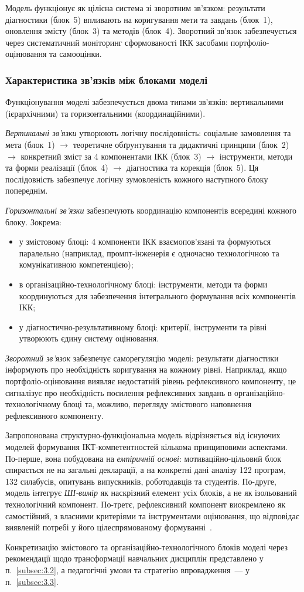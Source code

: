 Модель функціонує як цілісна система зі зворотним зв'язком: результати діагностики (блок~5) впливають на коригування мети та завдань (блок~1), оновлення змісту (блок~3) та методів (блок~4). Зворотний зв'язок забезпечується через систематичний моніторинг сформованості ІКК засобами портфоліо-оцінювання та самооцінки.

\subsubsection{Характеристика зв'язків між блоками моделі}\label{sssec:3.1.7}

Функціонування моделі забезпечується двома типами зв'язків: вертикальними (ієрархічними) та горизонтальними (координаційними).

\textit{Вертикальні зв'язки} утворюють логічну послідовність: соціальне замовлення та мета (блок~1) $\to$ теоретичне обґрунтування та дидактичні принципи (блок~2) $\to$ конкретний зміст за 4 компонентами ІКК (блок~3) $\to$ інструменти, методи та форми реалізації (блок~4) $\to$ діагностика та корекція (блок~5). Ця послідовність забезпечує логічну зумовленість кожного наступного блоку попереднім.

\textit{Горизонтальні зв'язки} забезпечують координацію компонентів всередині кожного блоку. Зокрема:
\begin{itemize}
    \item у змістовому блоці: 4 компоненти ІКК взаємопов'язані та формуються паралельно (наприклад, промпт-інженерія є одночасно технологічною та комунікативною компетенцією);
    \item в організаційно-технологічному блоці: інструменти, методи та форми координуються для забезпечення інтегрального формування всіх компонентів ІКК;
    \item у діагностично-результативному блоці: критерії, інструменти та рівні утворюють єдину систему оцінювання.
\end{itemize}

\textit{Зворотний зв'язок} забезпечує саморегуляцію моделі: результати діагностики інформують про необхідність коригування на кожному рівні. Наприклад, якщо портфоліо-оцінювання виявляє недостатній рівень рефлексивного компоненту, це сигналізує про необхідність посилення рефлексивних завдань в організаційно-технологічному блоці та, можливо, перегляду змістового наповнення рефлексивного компоненту.

Запропонована структурно-функціональна модель відрізняється від існуючих моделей формування ІКТ-компетентностей кількома принциповими аспектами. По-перше, вона побудована на \textit{емпіричній основі}: мотиваційно-цільовий блок спирається не на загальні декларації, а на конкретні дані аналізу 122 програм, 132 силабусів, опитувань випускників, роботодавців та студентів. По-друге, модель інтегрує \textit{ШІ-вимір} як наскрізний елемент усіх блоків, а не як ізольований технологічний компонент. По-третє, рефлексивний компонент виокремлено як самостійний, з власними критеріями та інструментами оцінювання, що відповідає виявленій потребі у його цілеспрямованому формуванні~\cite{Musiienko2026ScopingReview}.

Конкретизацію змістового та організаційно-технологічного блоків моделі через рекомендації щодо трансформації навчальних дисциплін представлено у п.~\ref{subsec:3.2}, а педагогічні умови та стратегію впровадження~--- у п.~\ref{subsec:3.3}.
